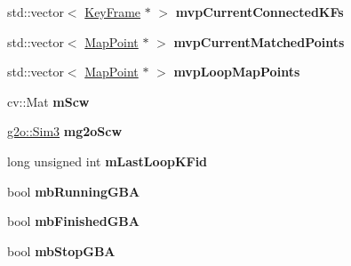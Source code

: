 \begin{DoxyCompactItemize}
\item 
\hypertarget{classORB__SLAM2_1_1LoopClosing_ad9595220811b5b814d1413451ecbaa4d}{std\-::vector$<$ \hyperlink{classORB__SLAM2_1_1KeyFrame}{Key\-Frame} $\ast$ $>$ {\bfseries mvp\-Current\-Connected\-K\-Fs}}\label{classORB__SLAM2_1_1LoopClosing_ad9595220811b5b814d1413451ecbaa4d}

\item 
\hypertarget{classORB__SLAM2_1_1LoopClosing_afd07791eb7a84ea2de2ab9d88e32d4dc}{std\-::vector$<$ \hyperlink{classORB__SLAM2_1_1MapPoint}{Map\-Point} $\ast$ $>$ {\bfseries mvp\-Current\-Matched\-Points}}\label{classORB__SLAM2_1_1LoopClosing_afd07791eb7a84ea2de2ab9d88e32d4dc}

\item 
\hypertarget{classORB__SLAM2_1_1LoopClosing_a52778b54f944bab5a3580b82233e8c72}{std\-::vector$<$ \hyperlink{classORB__SLAM2_1_1MapPoint}{Map\-Point} $\ast$ $>$ {\bfseries mvp\-Loop\-Map\-Points}}\label{classORB__SLAM2_1_1LoopClosing_a52778b54f944bab5a3580b82233e8c72}

\item 
\hypertarget{classORB__SLAM2_1_1LoopClosing_abbb5a5f8a46de211d46aaa6129385ac2}{cv\-::\-Mat {\bfseries m\-Scw}}\label{classORB__SLAM2_1_1LoopClosing_abbb5a5f8a46de211d46aaa6129385ac2}

\item 
\hypertarget{classORB__SLAM2_1_1LoopClosing_a9ea331d48d572c8e269c90d35c0de1e7}{\hyperlink{structg2o_1_1Sim3}{g2o\-::\-Sim3} {\bfseries mg2o\-Scw}}\label{classORB__SLAM2_1_1LoopClosing_a9ea331d48d572c8e269c90d35c0de1e7}

\item 
\hypertarget{classORB__SLAM2_1_1LoopClosing_a6a6ee027c2c4c45fcd3811819c22953a}{long unsigned int {\bfseries m\-Last\-Loop\-K\-Fid}}\label{classORB__SLAM2_1_1LoopClosing_a6a6ee027c2c4c45fcd3811819c22953a}

\item 
\hypertarget{classORB__SLAM2_1_1LoopClosing_ad04c8ddd2135b81fabfa45891ab66add}{bool {\bfseries mb\-Running\-G\-B\-A}}\label{classORB__SLAM2_1_1LoopClosing_ad04c8ddd2135b81fabfa45891ab66add}

\item 
\hypertarget{classORB__SLAM2_1_1LoopClosing_acdfbeff51644bd4c3d2d54c637d95e6c}{bool {\bfseries mb\-Finished\-G\-B\-A}}\label{classORB__SLAM2_1_1LoopClosing_acdfbeff51644bd4c3d2d54c637d95e6c}

\item 
\hypertarget{classORB__SLAM2_1_1LoopClosing_a7e24710761d1788f395fafc16a1a8e80}{bool {\bfseries mb\-Stop\-G\-B\-A}}\label{classORB__SLAM2_1_1LoopClosing_a7e24710761d1788f395fafc16a1a8e80}


\end{DoxyCompactItemize}
